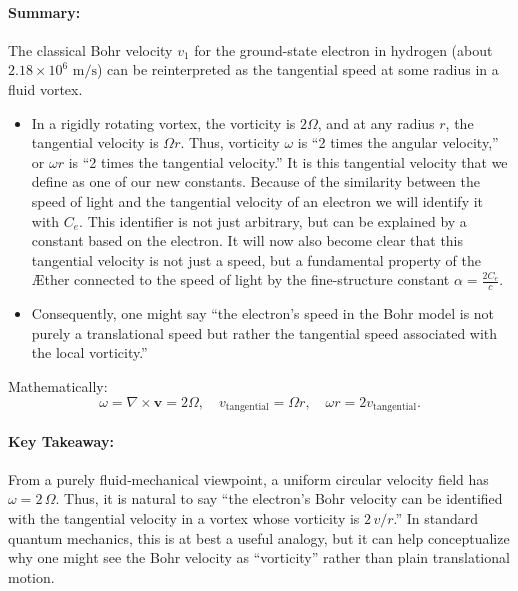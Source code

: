 \paragraph{Summary:}
The classical Bohr velocity $v_1$ for the ground-state electron in hydrogen (about $2.18 \times 10^6 \text{ m/s}$) can be reinterpreted as the tangential speed at some radius in a fluid vortex.

\begin{itemize}
    \item In a rigidly rotating vortex, the vorticity is $2\Omega$, and at any radius $r$, the tangential velocity is $\Omega r$.
    Thus, vorticity $\omega$ is ``2 times the angular velocity,'' or $\omega r$ is ``2 times the tangential velocity.'' It is this tangential velocity that we define as one of our new constants.
    Because of the similarity between the speed of light and the tangential velocity of an electron we will identify it with $C_e$.
    This identifier is not just arbitrary, but can be explained by a constant based on the electron.
    It will now also become clear that this tangential velocity is not just a speed, but a fundamental property of the \AE ther connected to the speed of light by the fine-structure constant $\alpha = \frac{2 C_e}{c}$.
    \item Consequently, one might say ``the electron’s speed in the Bohr model is not purely a translational speed but rather the tangential speed associated with the local vorticity.''
\end{itemize}

Mathematically:
\begin{equation}
    \boxed{ \omega = \nabla \times \mathbf{v} = 2\Omega,\quad v_{\text{tangential}} = \Omega r, \quad \omega r = 2 v_{\text{tangential}}. }\label{eq:2-times-tangential}
\end{equation}


\paragraph{Key Takeaway:} From a purely fluid‐mechanical viewpoint, a uniform circular velocity field has $\omega = 2 \,\Omega$.
Thus, it is natural to say “the electron’s Bohr velocity can be identified with the tangential velocity in a vortex whose vorticity is $2\,v/r$.” In standard quantum mechanics, this is at best a useful analogy, but it can help conceptualize why one might see the Bohr velocity as “vorticity” rather than plain translational motion.

